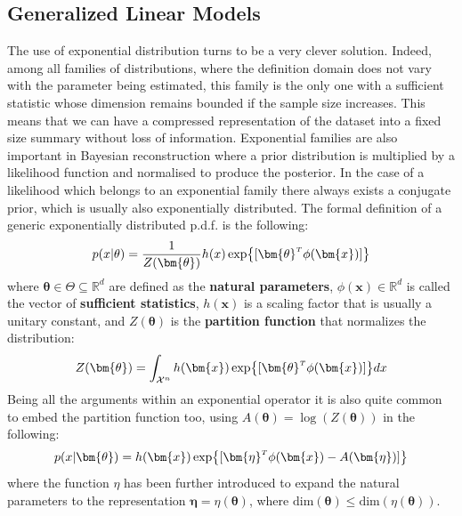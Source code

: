 \subsection{Generalized Linear Models}
The use of exponential distribution turns to be a very clever solution. Indeed, among all families of distributions, where the definition domain does not vary with the parameter being estimated, this family is the only one with a sufficient statistic whose dimension remains bounded if the sample size increases. This means that we can have a compressed representation of the dataset into a fixed size summary without loss of information.
Exponential families are also important in Bayesian reconstruction where a prior distribution is multiplied by a likelihood function and normalised to produce the posterior. In the case of a likelihood which belongs to an exponential family there always exists a conjugate prior, which is usually also exponentially distributed. 
%
The formal definition of a generic exponentially distributed p.d.f. is the following:
\begin{equation}
    p(x|\theta) = \frac{1}{Z(\bm{\theta})}h(x) \exp{[\transpose{\bm{\theta}} \phi(\bm{x})]}
\end{equation}
where $\bm{\theta} \in \Theta \subseteq \mathbb{R}^d$ are defined as the \textbf{natural parameters}, $\phi(\bm{x}) \in \mathbb{R}^d$ is called the vector of \textbf{sufficient statistics}, $h(\bm{x})$ is a scaling factor that is usually a unitary constant, and $Z(\bm{\theta})$ is the \textbf{partition function} that normalizes the distribution:
\begin{equation}
    Z(\bm{\theta}) = 
    \int_{\mathcal{X}^n} h(\bm{x}) \exp{[\transpose{\bm{\theta}} \phi(\bm{x})]} dx
\end{equation}
Being all the arguments within an exponential operator it is also quite common to embed the partition function too, using $ A(\bm{\theta}) = \log\left(Z(\bm{\theta})\right)$ in the following:
\begin{equation}
    p(x|\bm{\theta}) = h(\bm{x}) \exp{[\transpose{\bm{\eta}}\phi(\bm{x}) - A(\bm{\eta}) ]}
\end{equation}
where the function $\eta$ has been further introduced to expand the natural parameters to the representation $\bm{\eta}=\eta(\bm{\theta})$, where $\text{dim}(\bm{\theta}) \leq \text{dim}\left(\eta(\bm{\theta})\right)$.

